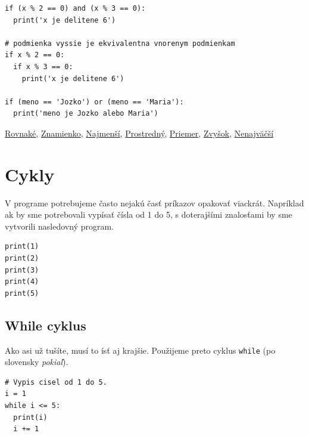 \begin{lstlisting}
if (x % 2 == 0) and (x % 3 == 0):
  print('x je delitene 6')

# podmienka vyssie je ekvivalentna vnorenym podmienkam
if x % 2 == 0:
  if x % 3 == 0:
    print('x je delitene 6')

if (meno == 'Jozko') or (meno == 'Maria'):
  print('meno je Jozko alebo Maria')
\end{lstlisting}

\href{https://testovac.ksp.sk/tasks/ls-uvod-rovnake/}{Rovnaké},
\href{https://testovac.ksp.sk/tasks/ls-uvod-znamienko/}{Znamienko},
\href{https://testovac.ksp.sk/tasks/ls-uvod-najmensi/}{Najmenší},
\href{https://testovac.ksp.sk/tasks/ls-uvod-prostredny/}{Prostredný},
\href{https://testovac.ksp.sk/tasks/ls-uvod-priemer/}{Priemer},
\href{https://testovac.ksp.sk/tasks/ls-uvod-zvysok/}{Zvyšok},
\href{https://testovac.ksp.sk/tasks/ls-uvod-nenajvacsi/}{Nenajväčší}

\section{Cykly}
V programe potrebujeme často nejakú časť príkazov opakovať viackrát. Napríklad ak by sme potrebovali vypísať čísla od 1 do 5, s doterajšími znalosťami by sme vytvorili nasledovný program.
\begin{lstlisting}
print(1)
print(2)
print(3)
print(4)
print(5)
\end{lstlisting}

\subsection{While cyklus}
Ako asi už tušíte, musí to ísť aj krajšie. Použijeme preto cyklus \texttt{while} (po slovensky \textit{pokiaľ}).
\begin{lstlisting}
# Vypis cisel od 1 do 5.
i = 1
while i <= 5:
  print(i)
  i += 1
\end{lstlisting}


